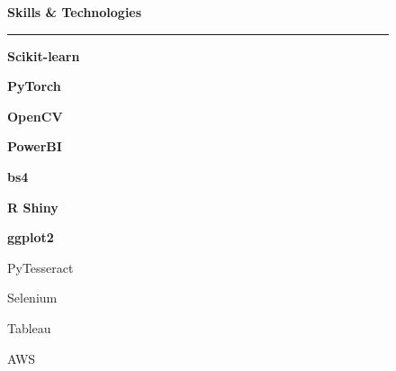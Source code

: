 \documentclass[a4paper, 10pt]{article}
\newcommand{\lhsWidth}{0.3\textwidth}
\newenvironment{mainSkillBox}[2]{%
  \colorbox{mainSkillBoxCol}{%
    \parbox{#2}{%
	\centering
      \textbf{\textcolor{mainSkillTextCol} {#1}}
    }
  }
}{}
\newenvironment{subSkillBox}[2]{%
  \colorbox{subSkillBoxCol}{%
    \parbox{#2}{%
	\centering
      {\textcolor{subSkillTextCol} {#1}}
    }
  }
}{}
\begin{document}
\begin{figure}[h]
\begin{minipage}[t][\paperheight][t]{\lhsWidth}
	{\large \textbf{Skills \& Technologies}} \newline
	\rule [6pt]{\linewidth}{1pt}
	\vspace{-15pt}
	\newline \vspace{3pt}
	\begin{mainSkillBox}{Scikit-learn}{60pt}
	\end{mainSkillBox}
	\begin{mainSkillBox}{PyTorch}{40pt}
	\end{mainSkillBox}
	\newline \vspace{3pt}
	\begin{mainSkillBox}{OpenCV}{40pt}
	\end{mainSkillBox}
	\begin{mainSkillBox}{PowerBI}{40pt}
	\end{mainSkillBox}
	\begin{mainSkillBox}{bs4}{20pt}
	\end{mainSkillBox}
	\newline \vspace{3pt}
	\begin{mainSkillBox}{R Shiny}{45pt}
	\end{mainSkillBox}
	\begin{mainSkillBox}{ggplot2}{35pt}
	\end{mainSkillBox}
	\newline \vspace{3pt}
	\begin{subSkillBox}{PyTesseract}{50pt}
	\end{subSkillBox}
	\begin{subSkillBox}{Selenium}{40pt}
	\end{subSkillBox}
	\newline \vspace{3pt}
	\begin{subSkillBox}{Tableau}{35pt}
	\end{subSkillBox}
	\begin{subSkillBox}{AWS}{20pt}
	\end{subSkillBox}

	\vspace{3em}


\end{minipage}
\end{figure}
\end{document}
